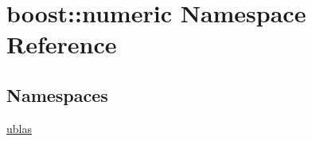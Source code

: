 \hypertarget{namespaceboost_1_1numeric}{}\section{boost\+:\+:numeric Namespace Reference}
\label{namespaceboost_1_1numeric}
\subsection*{Namespaces}
\begin{DoxyCompactItemize}
\item 
 \hyperlink{namespaceboost_1_1numeric_1_1ublas}{ublas}
\end{DoxyCompactItemize}
